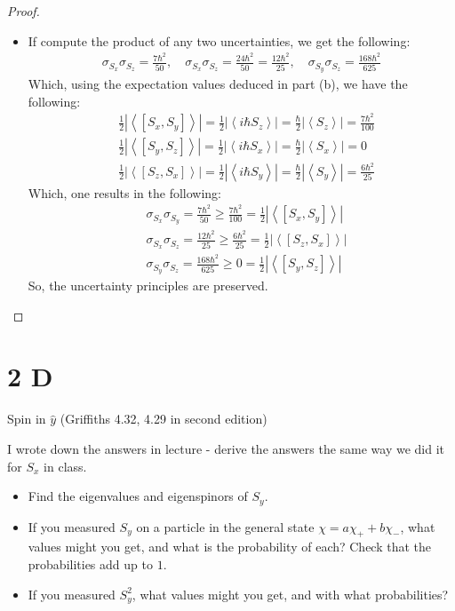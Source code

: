 \documentclass{article}
\begin{document}
\begin{proof}
\begin{itemize}
        \item[(d)] If compute the product of any two uncertainties, we get the following:
        \begin{align}
            \sigma_{S_x}\sigma_{S_z} = \frac{7\hbar^2}{50},\quad \sigma_{S_x}\sigma_{S_z} = \frac{24\hbar^2}{50} = \frac{12\hbar^2}{25},\quad \sigma_{S_y}\sigma_{S_z} = \frac{168\hbar^2}{625}
        \end{align}
        Which, using the expectation values deduced in part (b), we have the following:
        \begin{align}
            &\frac{1}{2}\left|\left<[S_x,S_y]\right>\right|= \frac{1}{2}\left|\left<i\hbar S_z\right>\right| = \frac{\hbar}{2}\left|\left<S_z\right>\right| = \frac{7\hbar^2}{100}\\
            &\frac{1}{2}\left|\left<[S_y,S_z]\right>\right|= \frac{1}{2}\left|\left<i\hbar S_x\right>\right| = \frac{\hbar}{2}\left|\left<S_x\right>\right| = 0\\
            &\frac{1}{2}\left|\left<[S_z,S_x]\right>\right|= \frac{1}{2}\left|\left<i\hbar S_y\right>\right| = \frac{\hbar}{2}\left|\left<S_y\right>\right| = \frac{6\hbar^2}{25}
        \end{align}
        Which, one results in the following:
        \begin{align}
            &\sigma_{S_x}\sigma_{S_y} = \frac{7\hbar^2}{50}\geq \frac{7\hbar^2}{100} = \frac{1}{2}\left|\left<[S_x,S_y]\right>\right|\\
            &\sigma_{S_x}\sigma_{S_z} = \frac{12\hbar^2}{25}\geq \frac{6\hbar^2}{25} = \frac{1}{2}\left|\left<[S_z,S_x]\right>\right|\\
            &\sigma_{S_y}\sigma_{S_z} = \frac{168\hbar^2}{625}\geq 0 = \frac{1}{2}\left|\left<[S_y,S_z]\right>\right|
        \end{align}
        So, the uncertainty principles are preserved.
    \end{itemize}
\end{proof}

\newpage

\section*{2 D}
\begin{ques}\label{q2}
Spin in $\hat{y}$ (Griffiths 4.32, 4.29 in second edition)

I wrote down the answers in lecture - derive the answers the same way we did it for $S_x$ in class.

\begin{itemize}
    \item[(a)] Find the eigenvalues and eigenspinors of $S_y$.
    \item[(b)] If you measured $S_y$ on a particle in the general state $\chi = a\chi_+ + b\chi_-$, what values might you get, and what is the probability of each? Check that the probabilities add up to $1$.
    \item[(c)] If you measured $S_y^2$, what values might you get, and with what probabilities? 
\end{itemize}
\end{ques}
\end{document}
